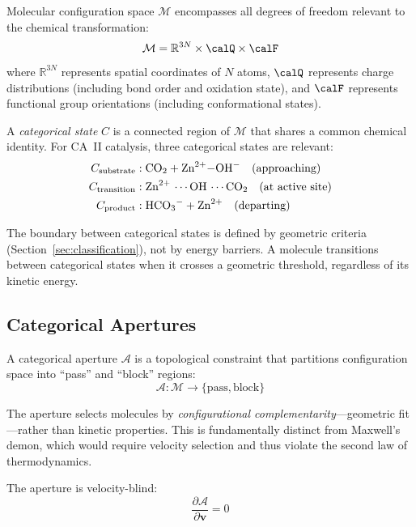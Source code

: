 \documentclass[twocolumn,amsmath,amssymb,aps,prb,superscriptaddress,longbibliography]{revtex4-2}
\newcommand{\calA}{\mathcal{A}}
\newcommand{\calM}{\mathcal{M}}
\begin{document}
Molecular configuration space $\calM$ encompasses all degrees of freedom relevant to the chemical transformation:
\begin{equation}
\calM = \mathbb{R}^{3N} \times \calQ \times \calF
\label{eq:config-space}
\end{equation}
where $\mathbb{R}^{3N}$ represents spatial coordinates of $N$ atoms, $\calQ$ represents charge distributions (including bond order and oxidation state), and $\calF$ represents functional group orientations (including conformational states).

A \emph{categorical state} $C$ is a connected region of $\calM$ that shares a common chemical identity. For CA~II catalysis, three categorical states are relevant:
\begin{align}
C_{\text{substrate}} &: \ce{CO2} + \ce{Zn^{2+}-OH-} \quad \text{(approaching)} \\
C_{\text{transition}} &: \ce{Zn^{2+} \cdots OH \cdots CO2} \quad \text{(at active site)} \\
C_{\text{product}} &: \ce{HCO3-} + \ce{Zn^{2+}} \quad \text{(departing)}
\end{align}

The boundary between categorical states is defined by geometric criteria (Section~\ref{sec:classification}), not by energy barriers. A molecule transitions between categorical states when it crosses a geometric threshold, regardless of its kinetic energy.

\subsection{Categorical Apertures}
\label{sec:apertures}

A categorical aperture $\calA$ is a topological constraint that partitions configuration space into ``pass'' and ``block'' regions:
\begin{equation}
\calA: \calM \to \{\text{pass}, \text{block}\}
\label{eq:aperture-def}
\end{equation}

The aperture selects molecules by \emph{configurational complementarity}---geometric fit---rather than kinetic properties. This is fundamentally distinct from Maxwell's demon, which would require velocity selection and thus violate the second law of thermodynamics.

The aperture is velocity-blind:
\begin{equation}
\frac{\partial \calA}{\partial \mathbf{v}} = 0
\label{eq:velocity-blind}
\end{equation}
\end{document}
